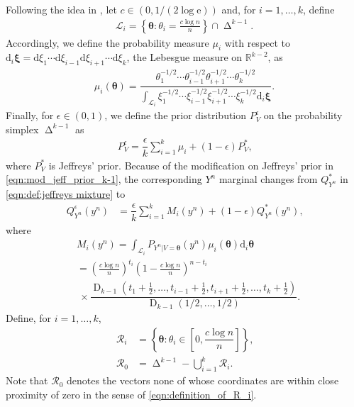 \documentclass[journal, 10pt]{IEEEtran}
\def\ds{\displaystyle}
\newcommand{\bbR}{\mathbb{R}}
\newcommand{\rmd}{\mathrm{d}}
\newcommand{\rme}{\mathrm{e}}
\newcommand{\cL}{\mathcal{L}}
\newcommand{\cR}{\mathcal{R}}
\theoremstyle{plain}
\theoremstyle{plain}
\theoremstyle{plain}
\theoremstyle{plain}
\newcommand{\boldtheta}{\mathbold{\theta}}
\newcommand{\boldxi}{\mathbold{\xi}}
\newcommand{\opD}{\operatorname{D}}
\newcommand{\simplex}{\operatorname{\Delta}}
\begin{document}
Following the idea in \cite{XieBarron1997}, let $c\in (0, 1/(2\log \rme))$ and, for $i=1,\hdots, k $, define
\begin{align}
\cL_i=\left\{ \boldtheta \colon \theta_i=\frac{c\log n}{n}\right\} \cap \simplex^{k-1}. 
\end{align}
Accordingly, we define the probability measure $\mu_i$ with respect to $\rmd_i\boldxi=\rmd\xi_1 \cdots \rmd\xi_{i-1} \rmd\xi_{i+1} \cdots \rmd\xi_k$, the Lebesgue measure on $\bbR^{k-2}$, as
\begin{align}
\mu _{i}\left( \boldtheta \right) =\dfrac {\theta^{-1/2} _{1}\cdots \theta^{-1/2} _{i-1}\theta^{-1/2} _{i+1}\cdots \theta^{-1/2} _{k}}{\ds\int _{\cL_i}\xi^{-1/2}_{1}\cdots \xi^{-1/2}_{i-1}\xi^{-1/2} _{i+1}\cdots \xi^{-1/2}_k \rmd_i\boldxi}\text{.}
\end{align}
Finally, for $\epsilon\in (0,1) $, we define the prior distribution $P^{\epsilon }_{V}$ on the probability simplex $\simplex^{k-1}$ as
\begin{align}
P^{\epsilon }_{V}=\dfrac {\epsilon }{k}\sum ^{k}_{i=1}\mu _{i}+\left( 1-\epsilon \right) P^{\ast }_{V}\text{,} \label{eqn:mod_jeff_prior_k-1}
\end{align}
where $P_V^\ast $ is Jeffreys' prior. Because of the modification on Jeffreys' prior in \eqref{eqn:mod_jeff_prior_k-1}, the corresponding $Y^n$ marginal changes from $Q_{Y^n}^\ast $ in \eqref{eqn:def:jeffreys mixture} to
\begin{align}
Q^{\epsilon }_{Y^n}\left( y^n\right)
&=
\dfrac {\epsilon }{k}\sum ^{k}_{i=1}M_{i}\left( y^{n}\right) +\left( 1-\epsilon \right) Q^{\ast }_{Y^n}\left( y^{n}\right)\text{,} \label{eqn:modified_jeffrey_k-1}
\end{align} 
where
\begin{align}
&M_{i}\left( y^{n}\right) = \int _{\cL_i}P_{Y^n | V=\boldtheta }\left( y^{n}\right) \mu_{i}\left( \boldtheta \right) \rmd_{i}\boldtheta \\
&=  \left(\frac{c\log n}{n}\right)^{t_i}\left(1-\frac{c\log n}{n}\right)^{n-t_i}\label{eqn:m_i}\\ 
&\ \times\dfrac {\opD_{k-1}\left( t_1+\frac12,\ldots ,t_{i-1}+\frac12,t_{i+1}+\frac12,\ldots ,t_{k}+\frac12\right) }{\opD_{k-1}\left( 1/2,\ldots ,1/2\right)}\text{.} \nonumber
\end{align}
Define, for $i=1,\hdots, k$,
\begin{align}
\cR_i&=\left\{ \boldtheta \colon \theta _{i}\in \left[0, \dfrac {c\log n}{n} \right]\right\}  \label{eqn:definition_of_R_i}\text{,} \\
\cR_0&=\simplex^{k-1} -\bigcup^{k}_{i=1}\cR_i\text{.} \label{eqn:definition_of_R}
\end{align}
Note that $\cR_0$ denotes the vectors none of whose coordinates are within close proximity of zero in the sense of \eqref{eqn:definition_of_R_i}. 
\end{document}
